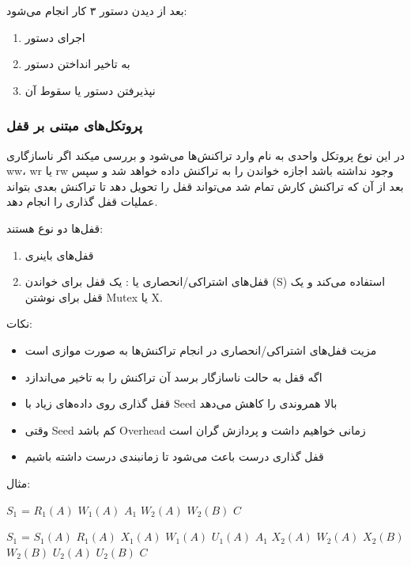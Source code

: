 \documentclass[a4paper]{article}
\begin{document}
بعد از دیدن دستور ۳ کار انجام می‌شود:

\begin{enumerate}
    \item اجرای دستور
    \item به تاخیر انداختن دستور
    \item نپذیرفتن دستور یا سقوط آن
\end{enumerate}

\subsubsection{پروتکل‌های مبتنی بر قفل}

در این نوع پروتکل واحدی به نام  وارد تراکنش‌ها می‌شود و بررسی
میکند اگر ناسازگاری ww، wr یا rw وجود نداشته باشد اجازه خواندن را به تراکنش داده
خواهد شد و سپس بعد از آن که تراکنش کارش تمام شد می‌تواند قفل را تحویل دهد تا
تراکنش بعدی بتواند عملیات قفل گذاری را انجام دهد.

قفل‌ها دو نوع هستند:

\begin{enumerate}
    \item قفل‌های باینری
    \item قفل‌های اشتراکی/انحصاری یا : یک قفل برای
    خواندن (S) استفاده می‌کند و یک قفل برای نوشتن Mutex یا X.
\end{enumerate}

نکات: 

\begin{itemize}
    \item مزیت قفل‌های اشتراکی/انحصاری در انجام تراکنش‌ها به صورت موازی است
    \item اگه قفل به حالت ناسازگار برسد آن تراکنش را به تاخیر می‌اندازد
    \item قفل گذاری روی داده‌های زیاد با Seed بالا همروندی را کاهش می‌دهد
    \item وقتی Seed کم باشد Overhead زمانی خواهیم داشت و پردازش گران است
    \item قفل گذاری درست باعث می‌شود تا زمانبندی درست داشته باشیم
\end{itemize}

مثال:

\begin{LTR}
    \centering
    $S_{1}$ = $R_{1}(A)$ $W_{1}(A)$ $A_{1}$ $W_{2}(A)$ $W_{2}(B)$ $C$

    $S_{1}$ = $S_{1}(A)$ $R_{1}(A)$ $X_{1}(A)$ $W_{1}(A)$ $U_{1}(A)$ $A_{1}$ $X_{2}(A)$ $W_{2}(A)$ $X_{2}(B)$ $W_{2}(B)$ $U_{2}(A)$ $U_{2}(B)$ $C$
\end{LTR}
\end{document}
